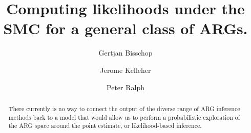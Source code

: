 \documentclass{article}
\begin{document}
\linenumbers
\title{Computing likelihoods under the SMC for a general class of ARGs.}

\author[1, $\dagger$]{Gertjan Bisschop}
\author[1]{Jerome Kelleher}
\author[3]{Peter Ralph}


\maketitle


\begin{abstract}
There currently is no way to connect the output of the diverse
range of ARG inference methods back
to a model that would allow us to perform a probabilistic exploration of the
ARG space around the point estimate, or likelihood-based inference.
\end{abstract}
\end{document}
